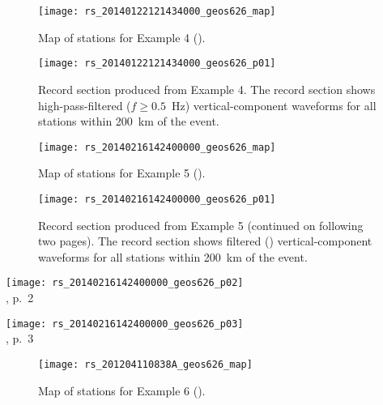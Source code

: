 \documentclass[11pt,titlepage,fleqn]{article}
\begin{document}

\clearpage\pagebreak
\begin{figure}
\centering
\texttt{[image: rs\_20140122121434000\_geos626\_map]}
\caption[]
{{
Map of stations for Example 4 ().
}}
\label{fig:map_ex04}
\end{figure}

\clearpage\pagebreak
\begin{figure}
\hspace{-1.25cm}
\texttt{[image: rs\_20140122121434000\_geos626\_p01]}
\caption[]
{{
Record section produced from Example 4.
The record section shows high-pass-filtered ($f \ge 0.5$~Hz) vertical-component waveforms for all stations within 200~km of the event.
}}
\label{fig:rs_ex04}
\end{figure}


\clearpage\pagebreak
\begin{figure}
\centering
\texttt{[image: rs\_20140216142400000\_geos626\_map]}
\caption[]
{{
Map of stations for Example 5 ().
}}
\label{fig:map_ex05}
\end{figure}

\clearpage\pagebreak
\begin{figure}
\hspace{-1cm}
\texttt{[image: rs\_20140216142400000\_geos626\_p01]}
\caption[]
{{
Record section produced from Example 5 (continued on following two pages).
The record section shows filtered () vertical-component waveforms for all stations within 200~km of the event.
}}
\label{fig:rs_ex05}
\end{figure}

\clearpage\pagebreak
\hspace{-1.25cm}
\texttt{[image: rs\_20140216142400000\_geos626\_p02]} \\
, p.~2

\clearpage\pagebreak
\hspace{-1.25cm}
\texttt{[image: rs\_20140216142400000\_geos626\_p03]} \\
, p.~3


\clearpage\pagebreak
\begin{figure}
\centering
\texttt{[image: rs\_201204110838A\_geos626\_map]}
\caption[]
{{
Map of stations for Example 6 ().
}}
\label{fig:map_ex06}
\end{figure}
\end{document}
